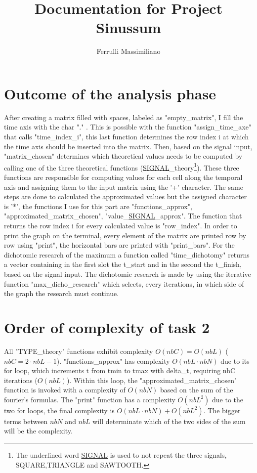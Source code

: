 \documentclass[11pt,a4paper]{article}
\title{Documentation for Project Sinussum}
\author{Ferrulli Massimiliano}
\date{}
\begin{document}
\maketitle

\section{Outcome of the analysis phase}
After creating a matrix filled with spaces, labeled as "empty\_matrix", I fill the time axis with the char "." . This is possible with the function "assign\_time\_axe" that calls "time\_index\_i", this last function determines the row index
i at which the time axis should be inserted into the matrix. Then, based on the signal input, "matrix\_chosen" determines which theoretical values needs to be computed by calling one of the three theoretical functions (\underline{SIGNAL}\_theory\footnote{The underlined word \underline{SIGNAL} is used to not repeat the three signals, SQUARE,TRIANGLE and SAWTOOTH.}).
These three functions are responsible for computing values for each cell along the temporal axis and assigning them to the input matrix using the '+' character. The same steps are done to calculated the approximated values but the assigned character is '*', the functions I use for this part are "functions\_approx", "approximated\_matrix\_chosen", "value\_\underline{SIGNAL}\_approx". 
The function that returns the row index i for every calculated value is "row\_index". In order to print the graph on the terminal, every element of the matrix are printed row by row using "print", the horizontal bars are printed with "print\_bars". 
For the dichotomic research of the maximum a function called "time\_dichotomy" returns a vector containing in the first slot the t\_start and in the second the t\_finish, based on the signal input. The dichotomic research is made by using the iterative function "max\_dicho\_research" which selects, every iterations, in which side of the graph the research must continue.





\section{Order of complexity of task 2}
All "TYPE\_theory" functions exhibit complexity $O(nbC) = O(nbL)$ ($nbC = 2 \cdot nbL - 1$). "functions\_approx" has complexity $O(nbL \cdot nbN)$ due to its for loop, which increments t from tmin to tmax with delta\_t, requiring nbC iterations ($O(nbL)$). Within this loop, the "approximated\_matrix\_chosen" function is invoked with a complexity of $O(nbN)$ based on the sum of the fourier's formulas. The "print" function has a complexity $O(nbL^2)$ due to the two for loops, the final complexity is $O(nbL \cdot nbN ) + O(nbL^2) $. The bigger terms between $nbN$ and $nbL$ will determinate which of the two sides of the sum will be the complexity.  
\end{document}
